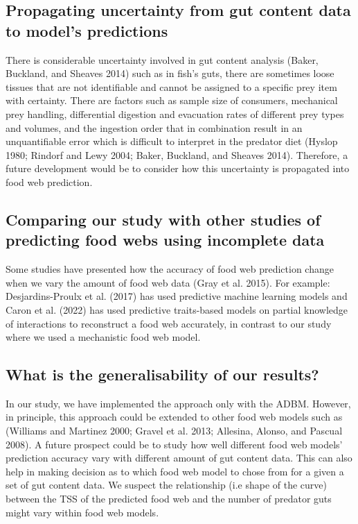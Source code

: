 \documentclass{article}
\begin{document}
\hypertarget{propagating-uncertainty-from-gut-content-data-to-models-predictions}{%
\subsection{Propagating uncertainty from gut content data to model's
predictions}\label{propagating-uncertainty-from-gut-content-data-to-models-predictions}}

There is considerable uncertainty involved in gut content analysis
(Baker, Buckland, and Sheaves 2014) such as in fish's guts, there are
sometimes loose tissues that are not identifiable and cannot be assigned
to a specific prey item with certainty. There are factors such as sample
size of consumers, mechanical prey handling, differential digestion and
evacuation rates of different prey types and volumes, and the ingestion
order that in combination result in an unquantifiable error which is
difficult to interpret in the predator diet (Hyslop 1980; Rindorf and
Lewy 2004; Baker, Buckland, and Sheaves 2014). Therefore, a future
development would be to consider how this uncertainty is propagated into
food web prediction.

\hypertarget{comparing-our-study-with-other-studies-of-predicting-food-webs-using-incomplete-data}{%
\subsection{Comparing our study with other studies of predicting food
webs using incomplete
data}\label{comparing-our-study-with-other-studies-of-predicting-food-webs-using-incomplete-data}}

Some studies have presented how the accuracy of food web prediction
change when we vary the amount of food web data (Gray et al. 2015). For
example: Desjardins-Proulx et al. (2017) has used predictive machine
learning models and Caron et al. (2022) has used predictive traits-based
models on partial knowledge of interactions to reconstruct a food web
accurately, in contrast to our study where we used a mechanistic food
web model.

\hypertarget{what-is-the-generalisability-of-our-results}{%
\subsection{What is the generalisability of our
results?}\label{what-is-the-generalisability-of-our-results}}

In our study, we have implemented the approach only with the ADBM.
However, in principle, this approach could be extended to other food web
models such as (Williams and Martinez 2000; Gravel et al. 2013;
Allesina, Alonso, and Pascual 2008). A future prospect could be to study
how well different food web models' prediction accuracy vary with
different amount of gut content data. This can also help in making
decision as to which food web model to chose from for a given a set of
gut content data. We suspect the relationship (i.e shape of the curve)
between the TSS of the predicted food web and the number of predator
guts might vary within food web models.
\end{document}
